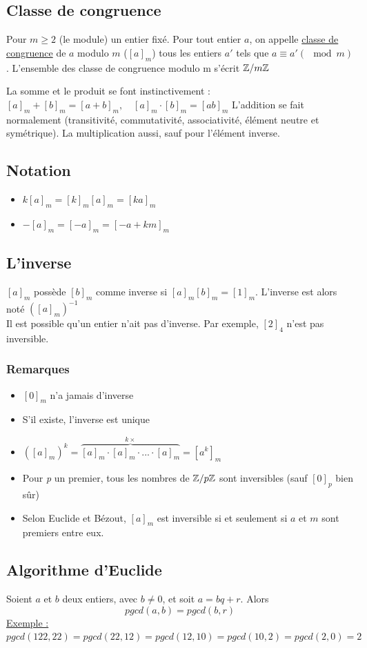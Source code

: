 \documentclass[11pt,a4paper]{article}
\begin{document}
\subsection{Classe de congruence}
Pour $m \geq 2$ (le module) un entier fixé. Pour tout entier $a$, on appelle \uline{classe de congruence} de $a$ modulo $m$ ($[a]_m$) tous les entiers $a'$ tels que $a \equiv a' (\mod m)$	. L'ensemble des classe de congruence modulo m s'écrit $\mathbb{Z}/m\mathbb{Z}$

La somme et le produit se font instinctivement : $[a]_m + [b]_m = [a+b]_m,\quad [a]_m \cdot [b]_m = [ab]_m$
L'addition se fait normalement (transitivité, commutativité, associativité, élément neutre et symétrique). La multiplication aussi, sauf pour l'élément inverse.
\subsection{Notation}
\begin{itemize}
	\item 	$k[a]_m = [k]_m[a]_m = [ka]_m$
	\item 	$-[a]_m = [-a]_m =[-a + km]_m$
\end{itemize}
\subsection{L'inverse}
$[a]_m$ possède $[b]_m$ comme inverse si $[a]_m[b]_m = [1]_m$. L'inverse est alors noté $([a]_m)^{-1}$\\
 Il est possible qu'un entier n'ait pas d'inverse. Par exemple, $[2]_4$ n'est pas inversible.
\subsubsection{Remarques}
\begin{itemize}
	\item 	$[0]_m$ n'a jamais d'inverse
	\item	S'il existe, l'inverse est unique
	\item 	$([a]_m)^k = \overbrace{[a]_m\cdot [a]_m \cdot ... \cdot [a]_m}^{k\times} = [a^k]_m$
	\item 	Pour \textit{p} un premier, tous les nombres de $\mathbb{Z}/p\mathbb{Z}$ sont inversibles (sauf $[0]_p$ bien sûr)
	\item 	Selon Euclide et Bézout, $[a]_m$ est inversible si et seulement si $a$ et $m$ sont premiers entre eux.
\end{itemize}

\subsection{Algorithme d'Euclide}
Soient $a$ et $b$ deux entiers, avec $b\neq 0$, et soit $a = bq + r$. Alors 
\begin{equation*}
	pgcd(a,b) = pgcd(b,r)
\end{equation*}
\uline{Exemple :}\\
$pgcd(122,22) = pgcd(22,12) = pgcd(12,10) = pgcd(10,2) = pgcd(2,0) = 2$	
\end{document}
